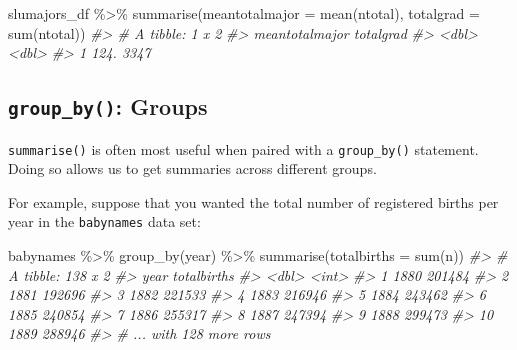 \documentclass[
]{book}
\newenvironment{Shaded}{\begin{snugshade}}{\end{snugshade}}
\newcommand{\AttributeTok}[1]{\textcolor[rgb]{0.77,0.63,0.00}{#1}}
\newcommand{\CommentTok}[1]{\textcolor[rgb]{0.56,0.35,0.01}{\textit{#1}}}
\newcommand{\FunctionTok}[1]{\textcolor[rgb]{0.00,0.00,0.00}{#1}}
\newcommand{\NormalTok}[1]{#1}
\newcommand{\SpecialCharTok}[1]{\textcolor[rgb]{0.00,0.00,0.00}{#1}}
\begin{document}
\begin{Shaded}
\begin{Highlighting}[]
\NormalTok{slumajors\_df }\SpecialCharTok{\%\textgreater{}\%}
  \FunctionTok{summarise}\NormalTok{(}\AttributeTok{meantotalmajor =} \FunctionTok{mean}\NormalTok{(ntotal),}
            \AttributeTok{totalgrad =} \FunctionTok{sum}\NormalTok{(ntotal))}
\CommentTok{\#\textgreater{} \# A tibble: 1 x 2}
\CommentTok{\#\textgreater{}   meantotalmajor totalgrad}
\CommentTok{\#\textgreater{}            \textless{}dbl\textgreater{}     \textless{}dbl\textgreater{}}
\CommentTok{\#\textgreater{} 1           124.      3347}
\end{Highlighting}
\end{Shaded}

\hypertarget{group_by-groups}{%
\subsection{\texorpdfstring{\texttt{group\_by()}: Groups}{group\_by(): Groups}}\label{group_by-groups}}

\texttt{summarise()} is often most useful when paired with a \texttt{group\_by()} statement. Doing so allows us to get summaries across different groups.

For example, suppose that you wanted the total number of registered births per year in the \texttt{babynames} data set:

\begin{Shaded}
\begin{Highlighting}[]
\NormalTok{babynames }\SpecialCharTok{\%\textgreater{}\%} \FunctionTok{group\_by}\NormalTok{(year) }\SpecialCharTok{\%\textgreater{}\%}
  \FunctionTok{summarise}\NormalTok{(}\AttributeTok{totalbirths =} \FunctionTok{sum}\NormalTok{(n))}
\CommentTok{\#\textgreater{} \# A tibble: 138 x 2}
\CommentTok{\#\textgreater{}     year totalbirths}
\CommentTok{\#\textgreater{}    \textless{}dbl\textgreater{}       \textless{}int\textgreater{}}
\CommentTok{\#\textgreater{}  1  1880      201484}
\CommentTok{\#\textgreater{}  2  1881      192696}
\CommentTok{\#\textgreater{}  3  1882      221533}
\CommentTok{\#\textgreater{}  4  1883      216946}
\CommentTok{\#\textgreater{}  5  1884      243462}
\CommentTok{\#\textgreater{}  6  1885      240854}
\CommentTok{\#\textgreater{}  7  1886      255317}
\CommentTok{\#\textgreater{}  8  1887      247394}
\CommentTok{\#\textgreater{}  9  1888      299473}
\CommentTok{\#\textgreater{} 10  1889      288946}
\CommentTok{\#\textgreater{} \# ... with 128 more rows}
\end{Highlighting}
\end{Shaded}
\end{document}
